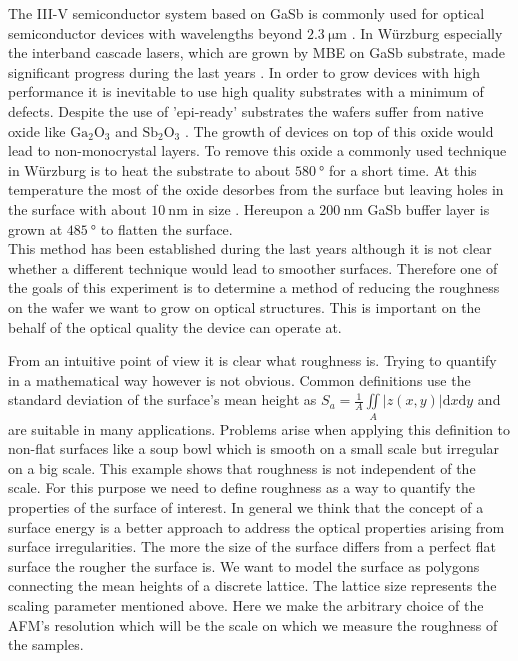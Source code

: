 The III-V semiconductor system based on GaSb is commonly used for optical semiconductor devices with wavelengths beyond $\SI{2.3}{\micro\meter}$ \cite{arafin}. In Würzburg especially the interband cascade lasers, which are grown by MBE on GaSb substrate, made significant progress during the last years \cite{weih}. In order to grow devices with high performance it is inevitable to use high quality substrates with a minimum of defects. Despite the use of 'epi-ready' substrates the wafers suffer from native oxide like $\mathrm{Ga}_2 \mathrm{O}_3$ and $\mathrm{Sb}_2 \mathrm{O}_3$ \cite{vineis}. The growth of devices on top of this oxide would lead to non-monocrystal layers. To remove this oxide a commonly used technique in Würzburg is to heat the substrate to about $\SI{580}{\degree}$ for a short time. At this temperature the most of the oxide desorbes from the surface but leaving holes in the surface with about  $\SI{10}{\nano\meter}$ in size \cite{murray}. Hereupon a $\SI{200}{\nano\meter}$ GaSb buffer layer is grown at $\SI{485}{\degree}$ to flatten the surface. \\  This method has been established during the last years although it is not clear whether a different technique would lead to smoother surfaces. Therefore one of the goals of this experiment is to determine a method of reducing the roughness on the wafer we want to grow on optical structures. This is important on the behalf of the optical quality the device can operate at.

From an intuitive point of view it is clear what roughness is. Trying to quantify in a mathematical way however is not obvious. Common definitions use the standard deviation of the surface's mean height as 
\mbox{$ S_a = \frac{1}{A} \iint\limits_{A}  \vert z \left( x,y \right)  \vert \mathrm dx \mathrm dy $} and are suitable in many applications. Problems arise when applying this definition to non-flat surfaces like a soup bowl which is smooth on a small scale but irregular on a big scale. This example shows that roughness is not independent of the scale. For this purpose we need to define roughness as a way to quantify the properties 
of the surface of interest.
In general we think that the concept of a surface energy is a better approach to address 
the optical properties arising from surface irregularities. The more the size of the surface differs from a perfect flat surface the rougher the surface is. We want to model the surface as polygons connecting the mean heights of a discrete lattice. 
The lattice size represents the scaling parameter mentioned above. Here we make the arbitrary choice of the AFM's resolution which will be the scale on which we measure the roughness of the samples.


